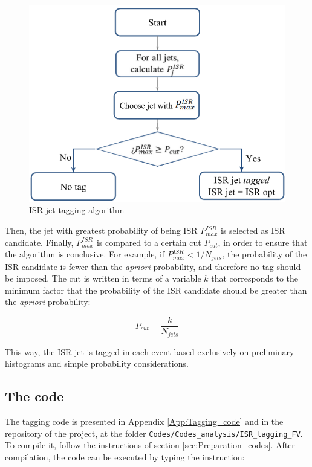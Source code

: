 \documentclass[12pt, oneside]{book}              %
\begin{document}
\begin{figure}[h]
	\centering
	\includegraphics[width=0.8\linewidth]{./Imags_Doc/Tagging_algorithm}
	\caption[ISR jet tagging algorithm]{ISR jet tagging algorithm}
	\label{fig:Tagging_algorithm}
\end{figure}

Then, the jet with greatest probability of being ISR $ P^{ISR}_{max} $ is selected as ISR candidate.
Finally, $ P^{ISR}_{max} $ is compared to a certain cut $ P_{cut} $, in order to ensure that the
algorithm is conclusive. For example, if $ P^{ISR}_{max} < 1/N_{jets} $, the probability of the
ISR candidate is fewer than the \textit{apriori} probability, and therefore no tag should be
imposed. The cut is written in terms of a variable $ k $ that corresponds to the minimum factor
that the probability of the ISR candidate should be greater than the \textit{apriori} probability:

\begin{equation} \label{eq:Prob_cut}
P_{cut} = \frac{k}{N_{jets}}
\end{equation}

This way, the ISR jet is tagged in each event based exclusively on preliminary histograms and 
simple probability considerations.

\subsection{The code}\label{sub:Tagging_code}

The tagging code is presented in Appendix \ref{App:Tagging_code} and in the repository 
of the project, at the folder \texttt{Codes/Codes\_analysis/ISR\_tagging\_FV}. To compile
it, follow the instructions of section \ref{sec:Preparation_codes}. After compilation,
the code can be executed by typing the instruction:
\end{document}
